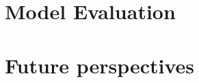 \documentclass[a4paper]{article}
\begin{document}







\section{Model Evaluation}

\section{Future perspectives}












\end{document}
